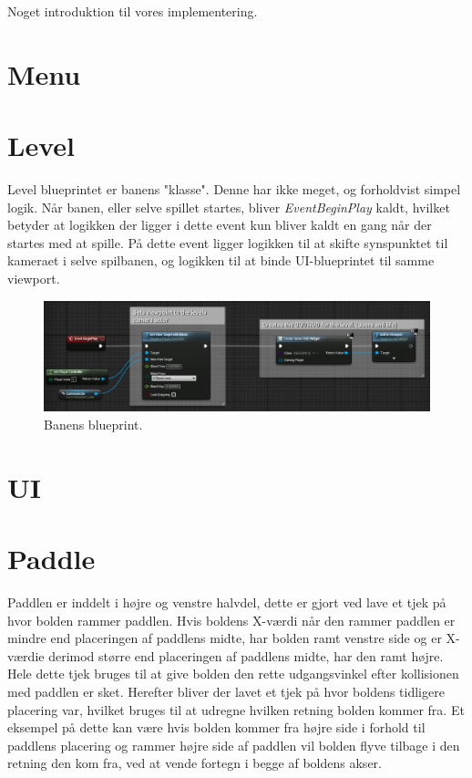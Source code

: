 Noget introduktion til vores implementering.

\section{Menu}


\section{Level}
Level blueprintet er banens "klasse". Denne har ikke meget, og forholdvist simpel logik. Når banen, eller selve spillet startes, bliver \textit{EventBeginPlay} kaldt, hvilket betyder at logikken der ligger i dette event kun bliver kaldt en gang når der startes med at spille. På dette event ligger logikken til at skifte synspunktet til kameraet i selve spilbanen, og logikken til at binde UI-blueprintet til samme viewport.

\begin{figure}
	\begin{center}
		\caption{Banens blueprint.}
		\label{dia:levelblueprint}
		\includegraphics[width=0.98\linewidth]{pictures/blueprints/level_blueprint}
	\end{center}
\end{figure}

\section{UI}


\section{Paddle}
Paddlen er inddelt i højre og venstre halvdel, dette er gjort ved lave et tjek på hvor bolden rammer paddlen. Hvis boldens X-værdi når den rammer paddlen er mindre end placeringen af paddlens midte, har bolden ramt venstre side og er X-værdie derimod større end placeringen af paddlens midte, har den ramt højre. Hele dette tjek bruges til at give bolden den rette udgangsvinkel efter kollisionen med paddlen er sket. Herefter bliver der lavet et tjek på hvor boldens tidligere placering var, hvilket bruges til at udregne hvilken retning bolden kommer fra. Et eksempel på dette kan være hvis bolden kommer fra højre side i forhold til paddlens placering og rammer højre side af paddlen vil bolden flyve tilbage i den retning den kom fra, ved at vende fortegn i begge af boldens akser.

